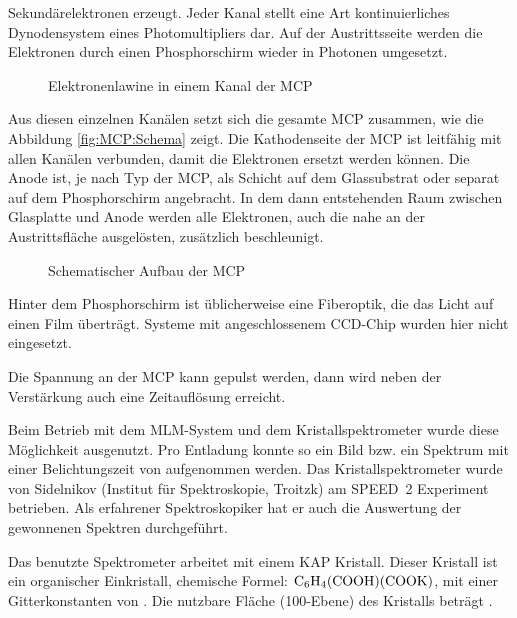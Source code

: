 Sekundärelektronen erzeugt. Jeder Kanal stellt eine Art
kontinuierliches Dynodensystem eines Photomultipliers dar. Auf der
Austrittsseite werden die Elektronen durch einen Phosphorschirm
wieder in Photonen umgesetzt.
%
\par
\begin{figure}[H]
  \center
  \caption{Elektronenlawine in einem Kanal der MCP}
  \label{fig:MCP:Kanal}
\end{figure}
%
\par
Aus diesen einzelnen Kanälen setzt sich die gesamte MCP zusammen, wie
die Abbildung \vref{fig:MCP:Schema} zeigt. Die Kathodenseite der MCP
ist leitfähig mit allen Kanälen verbunden, damit die Elektronen ersetzt
werden können. Die Anode ist, je nach Typ der MCP, als Schicht auf dem
Glassubstrat oder separat auf dem Phosphorschirm angebracht. In dem
dann entstehenden Raum zwischen Glasplatte und Anode werden alle
Elektronen, auch die nahe an der Austrittsfläche ausgelösten,
zusätzlich beschleunigt.
%
\par
\begin{figure}[H]
  \center
  \caption{Schematischer Aufbau der MCP}
  \label{fig:MCP:Schema}
\end{figure}
%
\par
Hinter dem Phosphorschirm ist üblicherweise eine Fiberoptik, die das
Licht auf einen Film überträgt. Systeme mit angeschlossenem CCD-Chip
wurden hier nicht eingesetzt.
\par
Die Spannung an der MCP kann gepulst werden, dann wird neben der
Verstärkung auch eine Zeitauflösung erreicht.
\par
Beim Betrieb mit dem MLM-System und dem Kristallspektrometer wurde
diese Möglichkeit ausgenutzt. Pro Entladung konnte so ein Bild bzw. ein
Spektrum mit einer Belichtungszeit von  aufgenommen
werden.
%
\label{sec:kristallspektrometer}
%
Das Kristallspektrometer wurde von Sidelnikov (Institut für
Spektroskopie, Troitzk) am SPEED~2 Experiment betrieben. Als erfahrener
Spektroskopiker hat er auch die Auswertung der gewonnenen Spektren
durchgeführt.
\par
Das benutzte Spektrometer arbeitet mit einem KAP Kristall. Dieser
Kristall ist ein organischer Einkristall, chemische Formel: $\rm
C_6H_4(COOH)(COOK)$, mit einer Gitterkonstanten von . Die nutzbare Fläche (100-Ebene) des Kristalls beträgt
 .
\par
